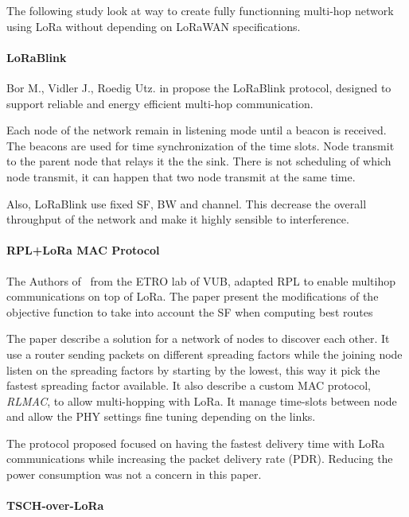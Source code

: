 The following study look at way to create fully functionning multi-hop network
using LoRa without depending on LoRaWAN specifications.

\paragraph{LoRaBlink}

Bor M., Vidler J., Roedig Utz. in \cite{lorablink} propose the LoRaBlink
protocol, designed to support reliable and energy efficient multi-hop
communication.

Each node of the network remain in listening mode until a beacon is received.
The beacons are used for time synchronization of the time slots.
Node transmit to the parent node that relays it the the sink.
There is not scheduling of which node transmit, it can happen that two node 
transmit at the same time.


Also, LoRaBlink use fixed SF, BW and channel. This decrease the overall throughput 
of the network and make it highly sensible to interference.

\paragraph{RPL+LoRa MAC Protocol}

The Authors of~\cite{8115756} from the ETRO lab of VUB, adapted RPL to enable
multihop communications on top of LoRa. The paper present the modifications of
the objective function to take into account the SF when computing best routes

The paper describe a solution for a network of nodes to discover each other. It
use a router sending packets on different spreading factors while the joining
node listen on the spreading factors by starting by the lowest, this way it
pick the fastest spreading factor available.
It also describe a custom MAC protocol, \emph{RLMAC}, to allow multi-hopping
with LoRa. It manage time-slots between node and allow the PHY settings fine
tuning depending on the links.

The protocol proposed focused on having the fastest delivery time with LoRa
communications while increasing the packet delivery rate (PDR).
Reducing the power consumption was not a concern in this paper.


\paragraph{TSCH-over-LoRa}

